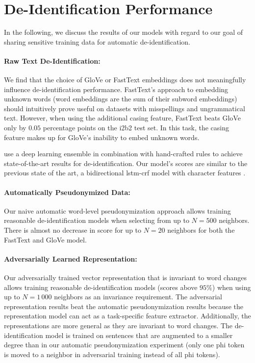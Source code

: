 \section{De-Identification Performance}

In the following, we discuss the results of our models with regard to our goal of sharing sensitive training data for automatic de-identification.

\paragraph{Raw Text De-Identification:}
%
We find that the choice of GloVe or FastText embeddings does not meaningfully influence de-identification performance.
%
FastText's approach to embedding unknown words (word embeddings are the sum of their subword embeddings) should intuitively prove useful on datasets with misspellings and ungrammatical text.
%
However, when using the additional casing feature, FastText beats GloVe only by $0.05$ percentage points on the i2b2 test set.
%
In this task, the casing feature makes up for GloVe's inability to embed unknown words.

%
\citet{liu2017identification} use a deep learning ensemble in combination with hand-crafted rules to achieve state-of-the-art results for de-identification.
%
Our model's scores are similar to the previous state of the art, a bidirectional \ac{lstm}-\ac{crf} model with character features \citep{dernoncourt2017identification}.

\paragraph{Automatically Pseudonymized Data:}
%
Our naive automatic word-level pseudonymization approach allows training reasonable de-identification models when selecting from up to $N=500$ neighbors.
%
There is almost no decrease in \fone score for up to $N = 20$ neighbors for both the FastText and GloVe model.

\paragraph{Adversarially Learned Representation:}
%
Our adversarially trained vector representation that is invariant to word changes allows training reasonable de-identification models (\fone scores above $95\%$) when using up to $N=1\,000$ neighbors as an invariance requirement.
%
The adversarial representation results beat the automatic pseudonymization results because the representation model can act as a task-specific feature extractor.
%
Additionally, the representations are more general as they are invariant to word changes.
%
The de-identification model is trained on sentences that are augmented to a smaller degree than in our automatic pseudonymization experiment (only one \ac{phi} token is moved to a neighbor in adversarial training instead of all \ac{phi} tokens).


